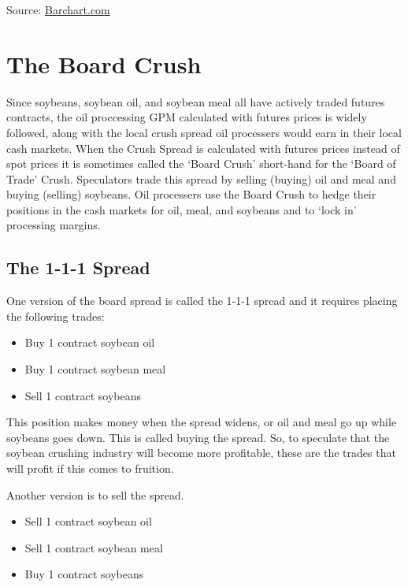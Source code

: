 \documentclass[]{book}
\providecommand{\tightlist}{%
  \setlength{\itemsep}{0pt}\setlength{\parskip}{0pt}}
\theoremstyle{definition}
\theoremstyle{definition}
\theoremstyle{remark}
\begin{document}
Source: \href{www.Barchart.com}{Barchart.com}

\section{The Board Crush}\label{the-board-crush}

Since soybeans, soybean oil, and soybean meal all have actively traded
futures contracts, the oil proccessing GPM calculated with futures
prices is widely followed, along with the local crush spread oil
processers would earn in their local cash markets. When the Crush Spread
is calculated with futures prices instead of spot prices it is sometimes
called the `Board Crush' short-hand for the `Board of Trade' Crush.
Speculators trade this spread by selling (buying) oil and meal and
buying (selling) soybeans. Oil processers use the Board Crush to hedge
their positions in the cash markets for oil, meal, and soybeans and to
`lock in' processing margins.

\subsection{The 1-1-1 Spread}\label{the-1-1-1-spread}

One version of the board spread is called the 1-1-1 spread and it
requires placing the following trades:

\begin{itemize}
\tightlist
\item
  Buy 1 contract soybean oil
\item
  Buy 1 contract soybean meal
\item
  Sell 1 contract soybeans
\end{itemize}

This position makes money when the spread widens, or oil and meal go up
while soybeans goes down. This is called buying the spread. So, to
speculate that the soybean crushing industry will become more
profitable, these are the trades that will profit if this comes to
fruition.

Another version is to sell the spread.

\begin{itemize}
\tightlist
\item
  Sell 1 contract soybean oil
\item
  Sell 1 contract soybean meal
\item
  Buy 1 contract soybeans
\end{itemize}
\end{document}
